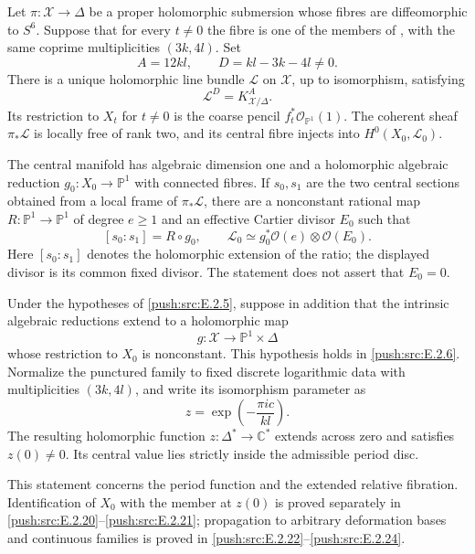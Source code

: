 \begin{proposition}\hypertarget{tag-033D}{}\label{push:src:E.2.5}


Let $\pi:\mathcal X\to\Delta$ be a proper holomorphic submersion
whose fibres are diffeomorphic to $S^6$.  Suppose that for every
$t\ne0$ the fibre is one of the members of , with the same
coprime multiplicities $(3k,4l)$.  Set
\[
 A=12kl,\qquad D=kl-3k-4l\ne0.
\]
There is a unique holomorphic line bundle $\mathcal L$ on
$\mathcal X$, up to isomorphism, satisfying
\[
 \mathcal L^{D}=K_{\mathcal X/\Delta}^{A}.
\]
Its restriction to $X_t$ for $t\ne0$ is the coarse pencil
$f_t^*\mathcal O_{\mathbb P^1}(1)$.  The coherent sheaf
$\pi_*\mathcal L$ is locally free of rank two, and its central
fibre injects into $H^0(X_0,\mathcal L_0)$.

The central manifold has algebraic dimension one and a
holomorphic algebraic reduction $g_0:X_0\to\mathbb P^1$ with
connected fibres.  If $s_0,s_1$ are the two central sections
obtained from a local frame of $\pi_*\mathcal L$, there are a
nonconstant rational map $R:\mathbb P^1\to\mathbb P^1$ of
degree $e\ge1$ and an effective Cartier divisor $E_0$ such that
\[
 [s_0:s_1]=R\circ g_0,\qquad
 \mathcal L_0\simeq g_0^*\mathcal O(e)\otimes\mathcal O(E_0).
\]
Here $[s_0:s_1]$ denotes the holomorphic extension of the ratio;
the displayed divisor is its common fixed divisor.  The
statement does not assert that $E_0=0$.
\end{proposition}

\begin{proposition}\hypertarget{tag-033F}{}\label{push:src:E.2.7}


Under the hypotheses of \ref{push:src:E.2.5}, suppose in addition that the
intrinsic algebraic reductions extend to a holomorphic map
\[
 g:\mathcal X\longrightarrow\mathbb P^1\times\Delta
\]
whose restriction to $X_0$ is nonconstant.  This hypothesis
holds in \ref{push:src:E.2.6}.  Normalize the punctured family to fixed
discrete logarithmic data with multiplicities $(3k,4l)$, and
write its isomorphism parameter as
\[
 z=\exp\!\left(-\frac{\pi i c}{kl}\right).
\]
The resulting holomorphic function $z:\Delta^*\to\mathbb C^*$
extends across zero and satisfies $z(0)\ne0$.  Its central
value lies strictly inside the admissible period disc.

This statement concerns the period function and the extended
relative fibration.  Identification of $X_0$ with the member
at $z(0)$ is proved separately in \ref{push:src:E.2.20}--\ref{push:src:E.2.21}; propagation
to arbitrary deformation bases and continuous families is
proved in \ref{push:src:E.2.22}--\ref{push:src:E.2.24}.
\end{proposition}

